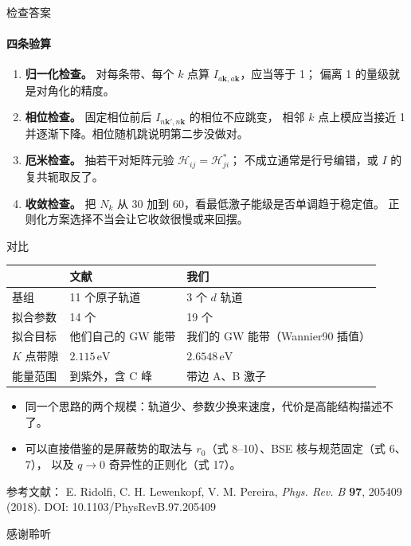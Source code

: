 \documentclass[aspectratio=169,11pt]{ctexbeamer}
\newcommand{\kk}{\mathbf{k}}
\newcommand{\kq}{\mathbf{k}'}
\begin{document}
\begin{frame}{检查答案}
  \framesubtitle{四条验算}
  \begin{enumerate}
    \item \textbf{归一化检查。} 对每条带、每个 $k$ 点算 $I_{a\kk,a\kk}$，应当等于 1；
          偏离 1 的量级就是对角化的精度。
    \item \textbf{相位检查。} 固定相位前后 $I_{n\kq,n\kk}$ 的相位不应跳变，
          相邻 $k$ 点上模应当接近 1 并逐渐下降。相位随机跳说明第二步没做对。
    \item \textbf{厄米检查。} 抽若干对矩阵元验 $\mathcal{H}_{ij}=\mathcal{H}^{*}_{ji}$；
          不成立通常是行号编错，或 $I$ 的复共轭取反了。
    \item \textbf{收敛检查。} 把 $N_k$ 从 30 加到 60，看最低激子能级是否单调趋于稳定值。
          正则化方案选择不当会让它收敛很慢或来回摆。
  \end{enumerate}
\end{frame}


\begin{frame}{对比}
  \centering
  \small
  \begin{tabular}{@{}lll@{}}
    \toprule
     & 文献 & 我们 \\
    \midrule
    基组 & 11 个原子轨道 & 3 个 $d$ 轨道 \\
    拟合参数 & 14 个 & 19 个 \\
    拟合目标 & 他们自己的 GW 能带 & 我们的 GW 能带（Wannier90 插值）\\
    $K$ 点带隙 & $2.115\,\mathrm{eV}$ & $2.6548\,\mathrm{eV}$ \\
    能量范围 & 到紫外，含 C 峰 & 带边 A、B 激子 \\
    \bottomrule
  \end{tabular}
  \vspace{5mm}
  \begin{itemize}
    \item 同一个思路的两个规模：轨道少、参数少换来速度，代价是高能结构描述不了。
    \item 可以直接借鉴的是屏蔽势的取法与 $r_0$（式 8--10）、BSE 核与规范固定（式 6、7），
      以及 $q\to0$ 奇异性的正则化（式 17）。
  \end{itemize}
\end{frame}

\begin{frame}{\Large 参考文献：}
  \small 
  E. Ridolfi, C. H. Lewenkopf, V. M. Pereira, \emph{Phys. Rev. B} \textbf{97}, 205409 (2018). DOI: 10.1103/PhysRevB.97.205409\\
\end{frame}

\begin{frame}
  \centering
  {\Huge 感谢聆听}
\end{frame}
\end{document}
